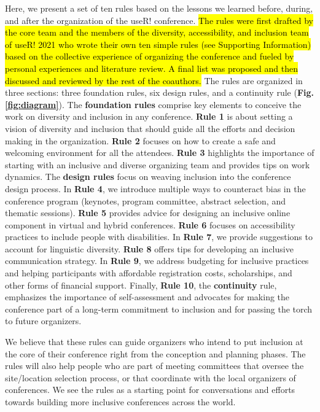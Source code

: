 \documentclass[10pt,letterpaper]{article}
\begin{document}
Here, we present a set of ten rules based on the lessons we learned before, during, and after the organization of the useR! conference.
 \hl{The rules were first drafted by the core team and the members of the diversity, accessibility, and inclusion team of useR! 2021 who wrote their own ten simple rules (see Supporting Information) based on the collective experience of organizing the conference and fueled by personal experiences and literature review.
A final list was proposed and then discussed and reviewed by the rest of the coauthors.} 
The rules are organized in three sections: three foundation rules, six design rules, and a continuity rule (\textbf{Fig. \ref{fig:diagram}}).
The \textbf{foundation rules} comprise key elements to conceive the work on diversity and inclusion in any conference. 
\textbf{Rule 1} is about setting a vision of diversity and inclusion that should guide all the efforts and decision making in the organization.
\textbf{Rule 2} focuses on how to create a safe and welcoming environment for all the attendees. 
\textbf{Rule 3} highlights the importance of starting with an inclusive and diverse organizing team and provides tips on work dynamics.
The \textbf{design rules} focus on weaving inclusion into the conference design process.
In \textbf{Rule 4}, we introduce multiple ways to counteract bias in the conference program (keynotes, program committee, abstract selection, and thematic sessions). 
\textbf{Rule 5} provides advice for designing an inclusive online component in virtual and hybrid conferences.
\textbf{Rule 6} focuses on accessibility practices to include people with disabilities.
In \textbf{Rule 7}, we provide suggestions to account for linguistic diversity. 
\textbf{Rule 8} offers tips for developing an inclusive communication strategy. 
In \textbf{Rule 9}, we address budgeting for inclusive practices and helping participants with affordable registration costs, scholarships, and other forms of financial support.
Finally, 
\textbf{Rule 10}, the \textbf{continuity} rule, emphasizes the importance of self-assessment and advocates for making the conference part of a long-term commitment to inclusion and for passing the torch to future organizers. 

We believe that these rules can guide organizers who intend to put inclusion at the core of their conference right from the conception and planning phases.
The rules will also help people who are part of meeting committees that oversee the site/location selection process, or that coordinate with the local organizers of conferences. 
We see the rules as a starting point for conversations and efforts towards building more inclusive conferences across the world.
\end{document}
